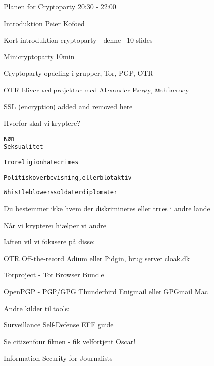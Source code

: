 \documentclass[20pt,landscape,a4paper,footrule]{foils}
\begin{document}



Planen for Cryptoparty 20:30 - 22:00
\begin{list2}
\item Introduktion Peter Kofoed
\item Kort introduktion cryptoparty - denne ~10 slides
\item Minicryptoparty 10min
\item Cryptoparty opdeling i grupper, Tor, PGP, OTR
\item OTR bliver ved projektor med Alexander Færøy, @ahfaeroey
\end{list2}


\centerline{SSL (encryption) added and removed here}




Hvorfor skal vi kryptere?

\begin{alltt}
       Køn
                       Seksualitet

 Tro religion       hatecrimes

 Politisk overbevisning, eller blot aktiv

 Whistleblowers             soldater      diplomater

\end{alltt}

\centerline{Du bestemmer ikke hvem der diskrimineres eller trues i andre lande}

\vskip2cm

Når vi krypterer hjælper vi andre!






Iaften vil vi fokusere på disse:
\begin{list2}
\item OTR Off-the-record Adium eller Pidgin, brug server cloak.dk
\item Torproject - Tor Browser Bundle
\item OpenPGP - PGP/GPG Thunderbird Enigmail eller GPGmail Mac
\end{list2}

Andre kilder til tools:
\begin{list2}
\item Surveillance Self-Defense EFF guide
\item Se citizenfour filmen - fik velfortjent Oscar!\\ {\footnotesize{}}
\item Information Security for Journalists\\
\end{list2}
\end{document}
